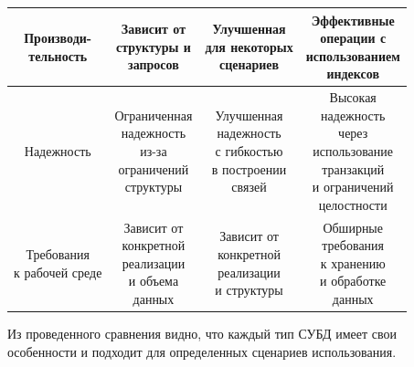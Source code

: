 \begin{table}[h]
\begin{center}
\begin{threeparttable}
\begin{tabular}{|c|c|c|c|}
				\hline \makecell{Производи-\\тельность} &\makecell{Зависит от\\структуры и\\запросов}&\makecell{Улучшенная\\для некоторых\\сценариев}&\makecell{Эффективные\\операции с\\использованием\\индексов} \\
				\hline Надежность &\makecell{Ограниченная\\надежность\\из-за\\ограничений\\ структуры}&\makecell{Улучшенная\\надежность\\с гибкостью\\в построении\\ связей}&\makecell{Высокая\\надежность\\через\\использование\\транзакций\\и ограничений\\ целостности}\\
				\hline \makecell{Требования\\к рабочей среде} &\makecell{Зависит от\\конкретной\\реализации\\и объема\\данных}&\makecell{Зависит от\\конкретной\\реализации\\и структуры}&\makecell{Обширные\\ требования\\к хранению\\и обработке\\данных}\\\hline
			\end{tabular}
		\end{threeparttable}
	\end{center}
\end{table}
\clearpage
Из проведенного сравнения видно, что каждый тип СУБД имеет свои особенности и подходит для определенных сценариев использования.

